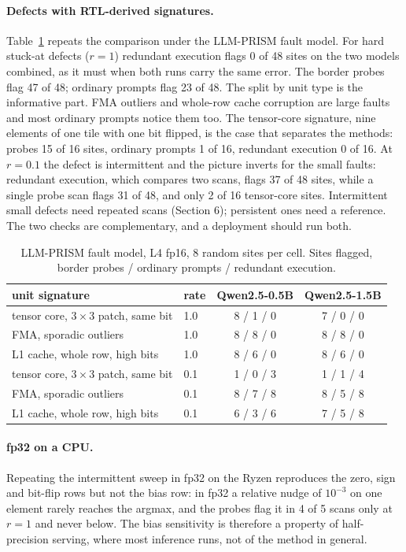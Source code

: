 \documentclass[11pt]{article}
\begin{document}
\paragraph{Defects with RTL-derived signatures.}
Table~\ref{tab:prism} repeats the comparison under the LLM-PRISM fault model. For hard stuck-at defects ($r=1$) redundant execution flags 0 of 48 sites on the two models combined, as it must when both runs carry the same error. The border probes flag 47 of 48; ordinary prompts flag 23 of 48. The split by unit type is the informative part. FMA outliers and whole-row cache corruption are large faults and most ordinary prompts notice them too. The tensor-core signature, nine elements of one tile with one bit flipped, is the case that separates the methods: probes 15 of 16 sites, ordinary prompts 1 of 16, redundant execution 0 of 16. At $r=0.1$ the defect is intermittent and the picture inverts for the small faults: redundant execution, which compares two scans, flags 37 of 48 sites, while a single probe scan flags 31 of 48, and only 2 of 16 tensor-core sites. Intermittent small defects need repeated scans (Section 6); persistent ones need a reference. The two checks are complementary, and a deployment should run both.

\begin{table}[t]\centering\small
\caption{LLM-PRISM fault model, L4 fp16, 8 random sites per cell. Sites flagged, border probes / ordinary prompts / redundant execution.}
\label{tab:prism}
\begin{tabular}{llcc}
\toprule
unit signature & rate & Qwen2.5-0.5B & Qwen2.5-1.5B\\
\midrule
tensor core, $3\times3$ patch, same bit & 1.0 & 8 / 1 / 0 & 7 / 0 / 0\\
FMA, sporadic outliers & 1.0 & 8 / 8 / 0 & 8 / 8 / 0\\
L1 cache, whole row, high bits & 1.0 & 8 / 6 / 0 & 8 / 6 / 0\\
tensor core, $3\times3$ patch, same bit & 0.1 & 1 / 0 / 3 & 1 / 1 / 4\\
FMA, sporadic outliers & 0.1 & 8 / 7 / 8 & 8 / 5 / 8\\
L1 cache, whole row, high bits & 0.1 & 6 / 3 / 6 & 7 / 5 / 8\\
\bottomrule
\end{tabular}
\end{table}

\paragraph{fp32 on a CPU.}
Repeating the intermittent sweep in fp32 on the Ryzen reproduces the zero, sign and bit-flip rows but not the bias row: in fp32 a relative nudge of $10^{-3}$ on one element rarely reaches the argmax, and the probes flag it in 4 of 5 scans only at $r=1$ and never below. The bias sensitivity is therefore a property of half-precision serving, where most inference runs, not of the method in general.
\end{document}

